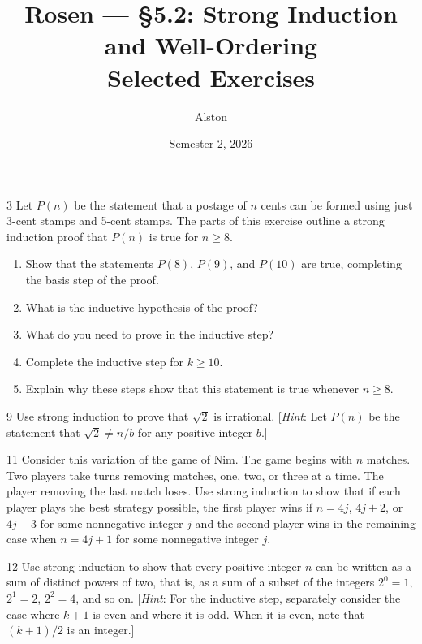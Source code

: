 \documentclass[11pt]{article}
\title{Rosen --- \S 5.2: Strong Induction and Well-Ordering\\ \large Selected Exercises}
\author{Alston}
\date{Semester 2, 2026}
\begin{document}
\maketitle

\begin{exercise}{3}
    Let $P(n)$ be the statement that a postage of $n$ cents can be
    formed using just 3-cent stamps and 5-cent stamps. The parts of
    this exercise outline a strong induction proof that $P(n)$ is true
    for $n \geq 8$.
    \begin{enumerate}[label=(\alph*)]
        \item Show that the statements $P(8)$, $P(9)$, and $P(10)$ are
        true, completing the basis step of the proof.
        \item What is the inductive hypothesis of the proof?
        \item What do you need to prove in the inductive step?
        \item Complete the inductive step for $k \geq 10$.
        \item Explain why these steps show that this statement is true
        whenever $n \geq 8$.
    \end{enumerate}
\end{exercise}

\begin{exercise}{9}
    Use strong induction to prove that $\sqrt{2}$ is irrational.
    [\emph{Hint}: Let $P(n)$ be the statement that $\sqrt{2} \neq n/b$
    for any positive integer $b$.]
\end{exercise}

\begin{exercise}{11}
    Consider this variation of the game of Nim. The game begins with
    $n$ matches. Two players take turns removing matches, one, two, or
    three at a time. The player removing the last match loses. Use
    strong induction to show that if each player plays the best
    strategy possible, the first player wins if $n = 4j$, $4j+2$, or
    $4j+3$ for some nonnegative integer $j$ and the second player wins
    in the remaining case when $n = 4j+1$ for some nonnegative integer
    $j$.
\end{exercise}

\begin{exercise}{12}
    Use strong induction to show that every positive integer $n$ can
    be written as a sum of distinct powers of two, that is, as a sum
    of a subset of the integers $2^0 = 1$, $2^1 = 2$, $2^2 = 4$, and so
    on.
    [\emph{Hint}: For the inductive step, separately consider the case
    where $k+1$ is even and where it is odd. When it is even, note
    that $(k+1)/2$ is an integer.]
\end{exercise}
\end{document}
